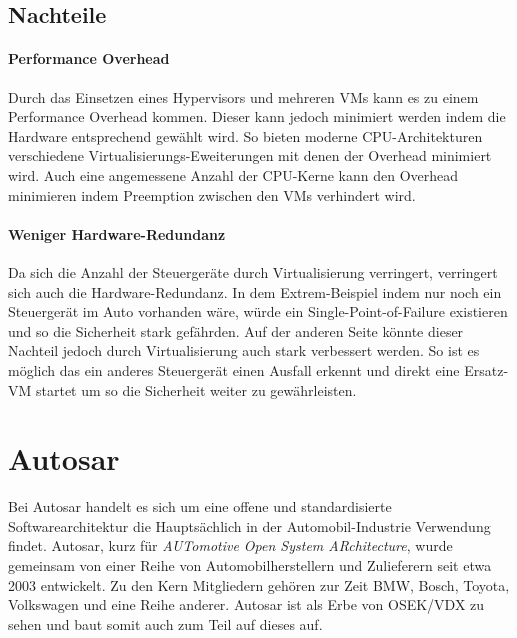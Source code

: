 \documentclass[
  a4paper,					    %
  twoside,
  DIV=calc,     				%
  bibliography=totoc,
  cleardoublepage=empty,
  ngerman,     					%
  final       					%
]{scrbook}
\begin{document}
\subsection{Nachteile}



\paragraph{Performance Overhead}
Durch das Einsetzen eines Hypervisors und mehreren VMs kann es zu einem Performance Overhead kommen. Dieser kann jedoch minimiert werden indem die Hardware entsprechend gewählt wird. So bieten moderne CPU-Architekturen verschiedene Virtualisierungs-Eweiterungen mit denen der Overhead minimiert wird. Auch eine angemessene Anzahl der CPU-Kerne kann den Overhead minimieren indem Preemption zwischen den VMs verhindert wird.

\paragraph{Weniger Hardware-Redundanz}
Da sich die Anzahl der Steuergeräte durch Virtualisierung verringert, verringert sich auch die Hardware-Redundanz. In dem Extrem-Beispiel indem nur noch ein Steuergerät im Auto vorhanden wäre, würde ein Single-Point-of-Failure existieren und so die Sicherheit stark gefährden. Auf der anderen Seite könnte dieser Nachteil jedoch durch Virtualisierung auch stark verbessert werden. So ist es möglich das ein anderes Steuergerät einen Ausfall erkennt und direkt eine Ersatz-VM startet um so die Sicherheit weiter zu gewährleisten. 






\section{Autosar}
\label{sec:Autosar}
Bei Autosar handelt es sich um eine offene und standardisierte Softwarearchitektur die Hauptsächlich in der Automobil-Industrie Verwendung findet. Autosar, kurz für \emph{AUTomotive Open System ARchitecture}, wurde gemeinsam von einer Reihe von Automobilherstellern und Zulieferern seit etwa 2003 entwickelt. Zu den Kern Mitgliedern gehören zur Zeit BMW, Bosch, Toyota, Volkswagen und eine Reihe anderer. Autosar ist als Erbe von OSEK/VDX zu sehen und baut somit auch zum Teil auf dieses auf.
\end{document}
